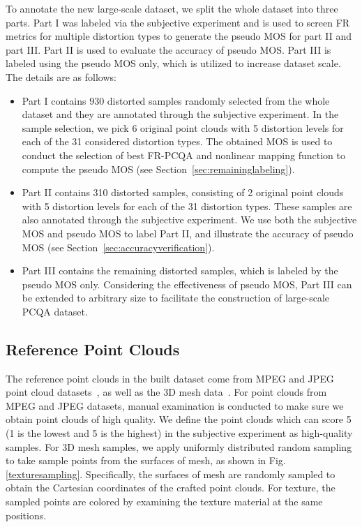 \documentclass[acmsmall]{acmart}
\begin{document}
\par To annotate the new large-scale dataset, we split the whole dataset into three parts. Part I was labeled via the subjective experiment and is used to screen FR metrics for multiple distortion types to generate the pseudo MOS for part II and part III. Part II is used to evaluate the accuracy of pseudo MOS. Part III is labeled using the pseudo MOS only, which is utilized to increase dataset scale. The details are as follows:
\begin{itemize}
 \item Part I contains 930 distorted samples randomly selected from the whole dataset and they are annotated through the subjective experiment. In the sample selection, we pick 6 original point clouds with 5 distortion levels for each of the 31 considered distortion types. The obtained MOS is used to conduct the selection of best FR-PCQA and nonlinear mapping function to compute the pseudo MOS (see Section~\ref{sec:remaininglabeling}).
 \item Part II contains 310 distorted samples, consisting of 2 original point clouds with 5 distortion levels for each of the 31 distortion types. These samples are also annotated through the subjective experiment. We use both the subjective MOS and pseudo MOS to label Part II, and illustrate the accuracy of pseudo MOS (see Section~\ref{sec:accuracyverification}).
 \item Part III contains the remaining distorted samples, which is labeled by the pseudo MOS only. Considering the effectiveness of pseudo MOS, Part III can be extended to arbitrary size to facilitate the construction of large-scale PCQA dataset.
\end{itemize}

\subsection{Reference Point Clouds}

\par The reference point clouds in the built dataset come from MPEG and JPEG point cloud datasets~\cite{Mpeg1,Mpeg2,JPEG,Mpeg3}, as well as the 3D mesh data~\cite{Nouri2017Greyc,free3d,sketchfab}. For point clouds from MPEG and JPEG datasets, manual examination is conducted to make sure we obtain point clouds of high quality. We define the point clouds which can score 5 (1 is the lowest and 5 is the highest) in the subjective experiment as high-quality samples. For 3D mesh samples, we apply uniformly distributed random sampling to take sample points from the surfaces of mesh, as shown in Fig. \ref{texturesampling}. Specifically, the surfaces of mesh are randomly sampled to obtain the Cartesian coordinates of the crafted point clouds. For texture, the sampled points are colored by examining the texture material at the same positions.
\end{document}
